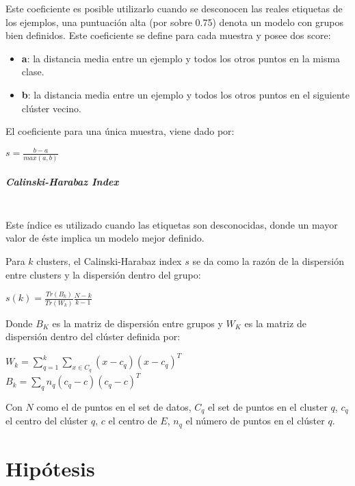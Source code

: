 Este coeficiente es posible utilizarlo cuando se desconocen las reales etiquetas de los ejemplos, una puntuación alta (por sobre 0.75) denota un modelo con grupos bien definidos. Este coeficiente se define para cada muestra y posee dos score:

\begin{itemize}
	
	\item \textbf{a}: la distancia media entre un ejemplo y todos los otros puntos en la misma clase.
	
	\item \textbf{b}: la distancia media entre un ejemplo y todos los otros puntos en el siguiente clúster vecino.
\end{itemize}

El coeficiente para una única muestra, viene dado por:

\begin{center}
	
	$s = \frac{b - a}{max(a, b)}$
\end{center}


\subparagraph{Calinski-Harabaz Index\\\\}

Este índice es utilizado cuando las etiquetas son desconocidas, donde un mayor valor de éste implica un modelo mejor definido.

Para $k$ clusters, el Calinski-Harabaz index $s$ se da como la razón de la dispersión entre clusters y la dispersión dentro del grupo:

\begin{center}
	$s(k) = \frac{Tr(B_k)}{Tr(W_k)}  \frac{N - k}{k - 1}$
\end{center}


Donde $B_{K}$ es la matriz de dispersión entre grupos y $W_{K}$ es la matriz de dispersión dentro del clúster definida por:

\begin{center}
	
	$W_k = \sum_{q=1}^k \sum_{x \in C_q} (x - c_q) (x - c_q)^T$\\
	$B_k = \sum_q n_q (c_q - c) (c_q - c)^T$
\end{center}

Con $N$ como el de puntos en el set de datos, $C_{q}$ el set de puntos en el cluster $q$, $c_{q}$ el centro del clúster $q$, $c$ el centro de $E$, $n_{q}$ el número de puntos en el clúster $q$.

\section{Hipótesis}

